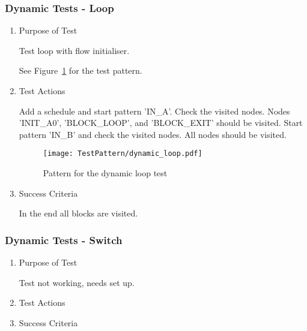 \subsubsection{Dynamic Tests - Loop}
\begin{enumerate}
	\item Purpose of Test

        Test loop with flow initialiser.

	See Figure~\ref{fig:Pattern_for_the_dynamic_loop_test} for the test pattern.
	\item Test Actions

        Add a schedule and start pattern 'IN\_A'. Check the visited nodes. Nodes 'INIT\_A0', 'BLOCK\_LOOP', and 'BLOCK\_EXIT' 
        should be visited. Start pattern 'IN\_B' and check the visited nodes. All nodes should be visited.
    \begin{figure}
        \centering 
        \texttt{[image: TestPattern/dynamic\_loop.pdf]}
        \caption{Pattern for the dynamic loop test}
        \label{fig:Pattern_for_the_dynamic_loop_test}
    \end{figure}
	\item Success Criteria

	In the end all blocks are visited.
\end{enumerate}
\subsubsection{Dynamic Tests - Switch}
\begin{enumerate}
	\item Purpose of Test

	Test not working, needs set up.
	\item Test Actions
	\item Success Criteria
\end{enumerate}
%
